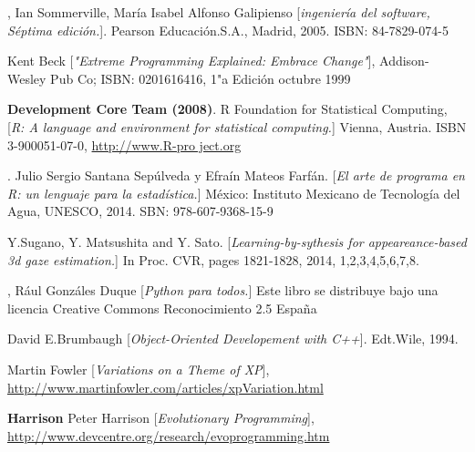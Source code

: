 \documentclass[12pt]{book} %
\begin{document}
\begin{thebibliography}{99} %

\small
{},
Ian Sommerville, María Isabel Alfonso Galipienso
[\textit{ingeniería del software, Séptima edición.}]. 
Pearson Educación.S.A., Madrid, 2005. ISBN: 84-7829-074-5

Kent Beck 
[\textit{"Extreme Programming Explained: Embrace Change"}],
Addison-Wesley Pub Co; ISBN: 0201616416, 1"a Edición octubre 1999

 {\textbf{Development Core Team (2008)}}. 
R Foundation for Statistical Computing, 
[\textit{R: A language and environment for statistical computing.}]
Vienna, Austria. ISBN 3-900051-07-0, \href{http://www.R-pro ject.org}{http://www.R-pro ject.org}

.
Julio Sergio Santana Sepúlveda y Efraín Mateos Farfán.
[\textit{El arte de programa en R: un lenguaje para la estadística.}]
México: Instituto Mexicano de Tecnología del Agua, UNESCO, 2014. SBN: 978-607-9368-15-9

Y.Sugano, Y. Matsushita and Y. Sato.
[\textit{Learning-by-sythesis for appeareance-based 3d gaze estimation.}]
In Proc. CVR, pages 1821-1828, 2014, 1,2,3,4,5,6,7,8.


,
Rául Gonzáles Duque
[\textit{Python para todos.}]
Este libro se distribuye bajo una licencia Creative Commons Reconocimiento 2.5 España

David E.Brumbaugh
[\textit{Object-Oriented Developement with C++}]. 
Edt.Wile, 1994.


Martin Fowler 
[\textit{Variations on a Theme of XP}], 
\href{http://www.martinfowler.com/articles/xpVariation.html}{http://www.martinfowler.com/articles/xpVariation.html}

 {\textbf{Harrison}}
Peter Harrison 
[\textit {Evolutionary Programming}],
\href{http://www.devcentre.org/research/evoprogramming.htm}{http://www.devcentre.org/research/evoprogramming.htm}


\end{thebibliography}


 
\end{document}
